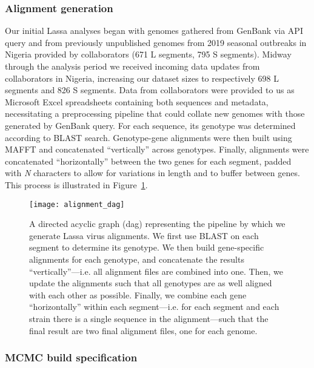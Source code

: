 \subsubsection{Alignment generation}

Our initial Lassa analyses began with genomes gathered from GenBank via API query and from previously unpublished genomes from 2019 seasonal outbreaks in Nigeria provided by collaborators (671 L segments, 795 S segments)\cite{kafetzopoulou2019metagenomic}.
Midway through the analysis period we received incoming data updates from collaborators in Nigeria, increasing our dataset sizes to respectively 698 L segments and 826 S segments.
Data from collaborators were provided to us as Microsoft Excel spreadsheets containing both sequences and metadata, necessitating a preprocessing pipeline that could collate new genomes with those generated by GenBank query.
For each sequence, its genotype was determined according to BLAST\cite{boratyn2013blast} search.
Genotype-gene alignments were then built using MAFFT and concatenated ``vertically'' across genotypes\cite{katoh2013mafft}.
Finally, alignments were concatenated ``horizontally'' between the two genes for each segment, padded with \textit{N} characters to allow for variations in length and to buffer between genes.
This process is illustrated in Figure~\ref{fig:alignment_dag}.

\begin{figure}[ht]
  \centering
  \medskip
  \texttt{[image: alignment\_dag]}
  \caption[Lassa alignment pipeline]{A directed acyclic graph (\gls{dag}) representing the pipeline by which we generate Lassa virus alignments. We first use BLAST on each segment to determine its genotype. We then build gene-specific alignments for each genotype, and concatenate the results ``vertically''---i.e. all alignment files are combined into one. Then, we update the alignments such that all genotypes are as well aligned with each other as possible. Finally, we combine each gene ``horizontally'' within each segment---i.e. for each segment and each strain there is a single sequence in the alignment---such that the final result are two final alignment files, one for each genome.}
  \label{fig:alignment_dag}
\end{figure}

\subsubsection{MCMC build specification}

